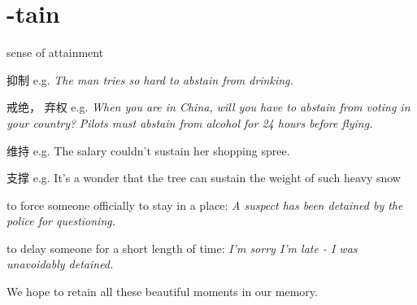 \chapter{-tain}

\begin{vocabulary}[maintain]
\end{vocabulary}

\begin{vocabulary}[obtain]
\end{vocabulary}

\begin{vocabulary}
    sense of attainment
\end{vocabulary}

\begin{vocabulary}[abstain]
    抑制
    e.g. \textit{The man tries so hard to abstain from drinking.}
    
    戒绝， 弃权
    e.g. \textit{When you are in China, will you have to abstain from voting in your country?}
    \textit{Pilots must abstain from alcohol for 24 hours before flying.}
\end{vocabulary}

\begin{vocabulary}
维持
e.g. The salary couldn't sustain her shopping spree.

支撑
e.g. It's a wonder that the tree can sustain the weight of such heavy snow

\end{vocabulary}

\begin{vocabulary}
to force someone officially to stay in a place:
\textit{A suspect has been detained by the police for questioning.}
 
to delay someone for a short length of time:
\textit{I'm sorry I'm late - I was unavoidably detained.}
\end{vocabulary}

\begin{vocabulary}[retain]
    We hope to retain all these beautiful moments in our memory.
\end{vocabulary}




